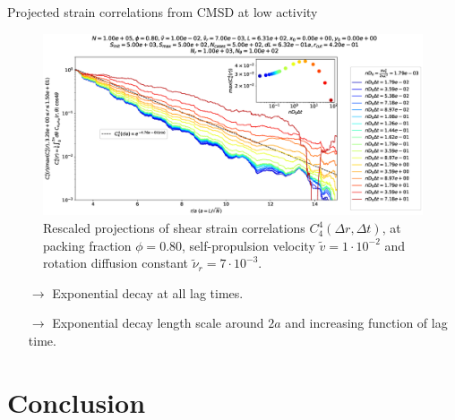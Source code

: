 \documentclass{beamer}
\begin{document}
\begin{frame}{Projected strain correlations from CMSD at low activity}

\vspace{-0.4cm}
\begin{figure}[h!]
  \centering
  \includegraphics[width=0.95\linewidth]{c44_max_cmsd_comparison_Dk8000_Vj1000_Ri7000_Nq1000_Ll0000_RCUTk4200_interpolated_linlog.eps}
  \vspace{-0.8cm}
  \caption{Rescaled projections of shear strain correlations $C_4^4(\Delta r, \Delta t)$, at packing fraction $\phi=0.80$, self-propulsion velocity $\tilde{v}=1\cdot10^{-2}$ and rotation diffusion constant $\tilde{\nu}_r=7\cdot10^{-3}$.}
\end{figure}

\vspace{-0.8cm}
\begin{itemize}
  \item[$\rightarrow$] Exponential decay at all lag times.
  \item[$\rightarrow$] Exponential decay length scale around $2a$ and increasing function of lag time.
\end{itemize}

\end{frame}

\section{Conclusion}
\end{document}
